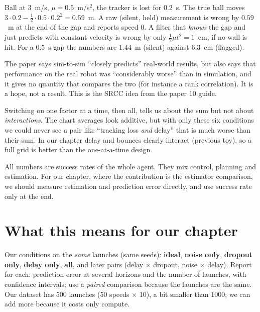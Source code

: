 \documentclass[11pt,a4paper]{article}
\begin{document}
\begin{toy}
Ball at $3$~m/s, $\mu=0.5$~m/s$^2$, the tracker is lost for $0.2$~s. The true ball moves
$3\cdot0.2-\tfrac12\cdot0.5\cdot0.2^2=0.59$~m. A raw (silent, held) measurement is wrong by
$0.59$~m at the end of the gap and reports speed $0$. A filter that \emph{knows} the gap and just
predicts with constant velocity is wrong by only $\tfrac12\mu t^2=1$~cm, if no wall is hit. For a
$0.5$~s gap the numbers are $1.44$~m (silent) against $6.3$~cm (flagged).
\end{toy}

\begin{warn}
The paper says sim-to-sim ``closely predicts'' real-world results, but also says that performance
on the real robot was ``considerably worse'' than in simulation, and it gives no quantity that
compares the two (for instance a rank correlation). It is a hope, not a result. This is the
SRCC idea from the paper 10 guide.
\end{warn}

\begin{warn}
Switching on one factor at a time, then all, tells us about the sum but not about
\emph{interactions}. The chart averages look additive, but with only these six conditions we
could never see a pair like ``tracking loss \emph{and} delay'' that is much worse than their
sum. In our chapter delay and bounces clearly interact (previous toy), so a full grid is
better than the one-at-a-time design.
\end{warn}

\begin{warn}
All numbers are success rates of the whole agent. They mix control, planning and estimation.
For our chapter, where the contribution is the estimator comparison, we should measure
estimation and prediction error directly, and use success rate only at the end.
\end{warn}

\section{What this means for our chapter}

\begin{ours}
Our conditions on the \emph{same} launches (same seeds): \textbf{ideal}, \textbf{noise only},
\textbf{dropout only}, \textbf{delay only}, \textbf{all}, and later pairs (delay $\times$ dropout,
noise $\times$ delay). Report for each: prediction error at several horizons and the number of
launches, with confidence intervals; use a \emph{paired} comparison because the launches are the
same. Our dataset has $500$ launches (50 speeds $\times$ 10), a bit smaller than $1000$; we can
add more because it costs only compute.
\end{ours}
\end{document}

